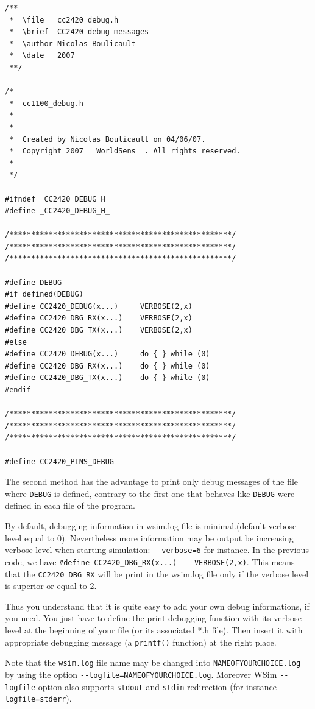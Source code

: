 \documentclass[a4paper,10pt]{report}
\begin{document}
\begin{verbatim}
/**
 *  \file   cc2420_debug.h
 *  \brief  CC2420 debug messages 
 *  \author Nicolas Boulicault
 *  \date   2007
 **/

/*
 *  cc1100_debug.h
 *  
 *
 *  Created by Nicolas Boulicault on 04/06/07.
 *  Copyright 2007 __WorldSens__. All rights reserved.
 *
 */

#ifndef _CC2420_DEBUG_H_
#define _CC2420_DEBUG_H_

/***************************************************/
/***************************************************/
/***************************************************/

#define DEBUG
#if defined(DEBUG)
#define CC2420_DEBUG(x...)     VERBOSE(2,x)
#define CC2420_DBG_RX(x...)    VERBOSE(2,x)
#define CC2420_DBG_TX(x...)    VERBOSE(2,x)
#else
#define CC2420_DEBUG(x...)     do { } while (0)
#define CC2420_DBG_RX(x...)    do { } while (0)
#define CC2420_DBG_TX(x...)    do { } while (0)
#endif

/***************************************************/
/***************************************************/
/***************************************************/

#define CC2420_PINS_DEBUG

\end{verbatim}

The second method has the advantage to print only debug messages of the file where \verb$DEBUG$ is defined, contrary to the first one that behaves like \verb$DEBUG$ were defined in each file of the program.

By default, debugging information in wsim.log file is minimal.(default verbose level equal to 0). Nevertheless more information may be output be increasing verbose level when starting simulation: \verb$--verbose=6$ for instance.
In the previous code, we have \verb$#define CC2420_DBG_RX(x...)    VERBOSE(2,x)$. This means that the \verb$CC2420_DBG_RX$ will be print in the wsim.log file only if the verbose level is superior or equal to 2.

Thus you understand that it is quite easy to add your own debug informations, if you need. You just have to define the print debugging function with its verbose level at the beginning of your file (or its associated *.h file). Then insert it with appropriate debugging message (a \verb$printf()$ function) at the right place.

Note that the \verb$wsim.log$ file name may be changed into \verb$NAMEOFYOURCHOICE.log$ by using the option \verb$--logfile=NAMEOFYOURCHOICE.log$. Moreover WSim \verb$--logfile$ option also supports \verb$stdout$ and \verb$stdin$ redirection (for instance \verb$--logfile=stderr$).
\end{document}
